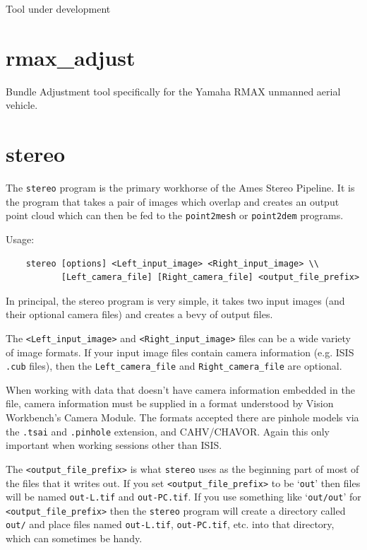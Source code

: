 Tool under development

\section{rmax\_adjust}
\label{ramx_adjust}

Bundle Adjustment tool specifically for the Yamaha RMAX unmanned
aerial vehicle.

\section{stereo}
\label{stereo}

The \texttt{stereo} program is the primary workhorse of the Ames
Stereo Pipeline.  It is the program that takes a pair of images which
overlap and creates an output point cloud which can then be fed to the
\texttt{point2mesh} or \texttt{point2dem} programs.

\medskip

Usage:
\begin{verbatim}
    stereo [options] <Left_input_image> <Right_input_image> \\
           [Left_camera_file] [Right_camera_file] <output_file_prefix>
\end{verbatim}

\medskip

In principal, the stereo program is very simple, it takes two input
images (and their optional camera files) and creates a bevy of
output files.

The \verb=<Left_input_image>= and \verb=<Right_input_image>= files can be a wide variety of image formats.  If your input image files contain camera information (e.g. ISIS \verb=.cub= files), then the \verb=Left_camera_file= and \verb=Right_camera_file= are optional.

When working with data that doesn't have camera information embedded
in the file, camera information must be supplied in a format
understood by Vision Workbench's Camera Module. The formats accepted
there are pinhole models via the \verb#.tsai# and \verb#.pinhole#
extension, and CAHV/CHAVOR. Again this only important when working sessions
other than ISIS.

The \verb=<output_file_prefix>= is what \verb=stereo= uses as the
beginning part of most of the files that it writes out.  If you set
\verb=<output_file_prefix>= to be `\verb=out=' then files will be
named \verb=out-L.tif= and  \verb=out-PC.tif=.  If you use something
like `\verb=out/out=' for \verb=<output_file_prefix>= then the
\verb=stereo= program will create a directory called \verb=out/= and
place files named \verb=out-L.tif=, \verb=out-PC.tif=, etc. into
that directory, which can sometimes be handy.

